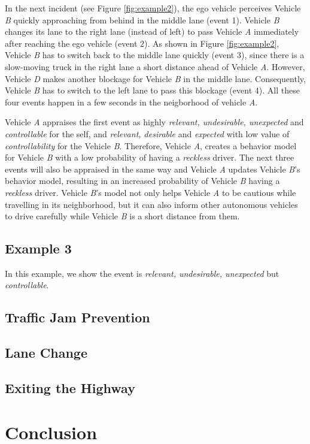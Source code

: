 \documentclass[journal, 11pt]{IEEEtran}
\begin{document}
In the next incident (see Figure \ref{fig:example2}), the ego vehicle perceives
Vehicle \textit{B} quickly approaching from behind in the middle lane (event 1).
Vehicle \textit{B} changes its lane to the right lane (instead of left) to pass
Vehicle \textit{A} immediately after reaching the ego vehicle (event 2). As
shown in Figure \ref{fig:example2}, Vehicle \textit{B} has to switch back to the
middle lane quickly (event 3), since there is a slow-moving truck in the right
lane a short distance ahead of Vehicle \textit{A}. However, Vehicle \textit{D}
makes another blockage for Vehicle \textit{B} in the middle lane. Consequently,
Vehicle \textit{B} has to switch to the left lane to pass this blockage (event
4). All these four events happen in a few seconds in the neigborhood of vehicle
\textit{A}.

Vehicle \textit{A} appraises the first event as highly \textit{relevant,
undesirable, unexpected} and \textit{controllable} for the self, and
\textit{relevant, desirable} and \textit{expected} with low value of
\textit{controllability} for the Vehicle \textit{B}. Therefore, Vehicle
\textit{A}, creates a behavior model for Vehicle \textit{B} with a low
probability of having a \textit{reckless} driver. The next three events will
also be appraised in the same way and Vehicle \textit{A} updates Vehicle
\textit{B}'s behavior model, resulting in an increased probability of
Vehicle \textit{B} having a \textit{reckless} driver. Vehicle \textit{B}'s
model not only helps Vehicle \textit{A} to be cautious while travelling in its
neighborhood, but it can also inform other autonomous vehicles to drive
carefully while Vehicle \textit{B} is a short distance from them.\\

\subsection{Example 3}
In this example, we show the event is \textit{relevant, undesirable, unexpected}
but \textit{controllable}.\\

\subsection{Traffic Jam Prevention}
\label{sec:lane-change}

\subsection{Lane Change}
\label{sec:lane-change}

\subsection{Exiting the Highway}
\label{sec:exit-highway}

\section{Conclusion}
\label{Conc}
%



% 
\end{document}
